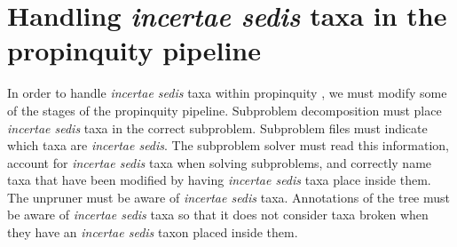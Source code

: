 \documentclass[english]{article}
\begin{document}
\section{Handling \emph{incertae sedis} taxa in the propinquity
pipeline}

In order to handle \emph{incertae sedis} taxa within propinquity \citep{redelings2017supertree}, we
must modify some of the stages of the propinquity pipeline.
Subproblem
decomposition must place \emph{incertae sedis} taxa in the correct
subproblem.
Subproblem files must indicate which taxa are \emph{incertae sedis}.
The subproblem solver must read this information, account for
\emph{incertae sedis} taxa when solving subproblems, and correctly
name taxa that have been modified by having \emph{incertae sedis} taxa
place inside them.
The unpruner must be aware of \emph{incertae sedis}
taxa.
Annotations of the tree must be aware of \emph{incertae sedis}
taxa so that it does not consider taxa broken when they have an
\emph{incertae sedis} taxon placed inside them.



\newpage %
\end{document}
